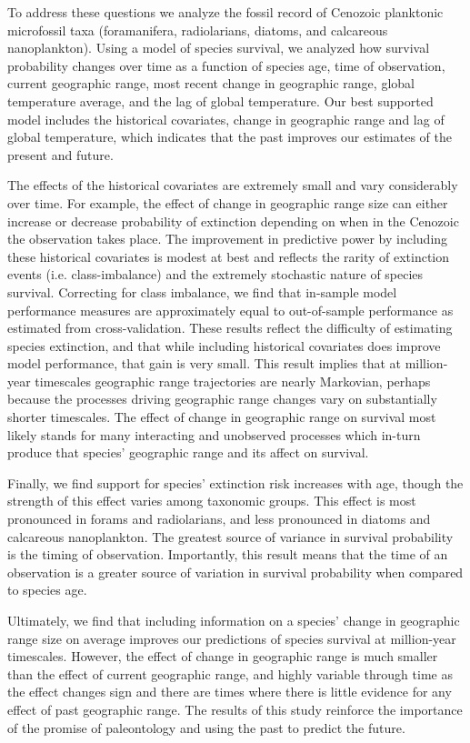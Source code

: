 \documentclass[12pt,letterpaper]{article}
\begin{document}
To address these questions we analyze the fossil record of Cenozoic planktonic microfossil taxa (foramanifera, radiolarians, diatoms, and calcareous nanoplankton). Using a model of species survival, we analyzed how survival probability changes over time as a function of species age, time of observation, current geographic range, most recent change in geographic range, global temperature average, and the lag of global temperature. Our best supported model includes the historical covariates, change in geographic range and lag of global temperature, which indicates that the past improves our estimates of the present and future. 

The effects of the historical covariates are extremely small and vary considerably over time. For example, the effect of change in geographic range size can either increase or decrease probability of extinction depending on when in the Cenozoic the observation takes place. The improvement in predictive power by including these historical covariates is modest at best and reflects the rarity of extinction events (i.e. class-imbalance) and the extremely stochastic nature of species survival. Correcting for class imbalance, we find that in-sample model performance measures are approximately equal to out-of-sample performance as estimated from cross-validation. These results reflect the difficulty of estimating species extinction, and that while including historical covariates does improve model performance, that gain is very small.  This result implies that at million-year timescales geographic range trajectories are nearly Markovian, perhaps because the processes driving geographic range changes vary on substantially shorter timescales. The effect of change in geographic range on survival most likely stands for many interacting and unobserved processes which in-turn produce that species' geographic range and its affect on survival. 

Finally, we find support for species' extinction risk increases with age, though the strength of this effect varies among taxonomic groups. This effect is most pronounced in forams and radiolarians, and less pronounced in diatoms and calcareous nanoplankton. The greatest source of variance in survival probability is the timing of observation. Importantly, this result means that the time of an observation is a greater source of variation in survival probability when compared to species age. 

Ultimately, we find that including information on a species' change in geographic range size on average improves our predictions of species survival at million-year timescales. However, the effect of change in geographic range is much smaller than the effect of current geographic range, and highly variable through time as the effect changes sign and there are times where there is little evidence for any effect of past geographic range. The results of this study reinforce the importance of the promise of paleontology and using the past to predict the future.
\end{document}
